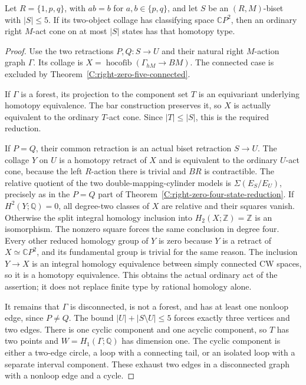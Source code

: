\begin{theorem}
\label{C:right-zero-five-state-reduction}
Let $R=\{1,p,q\}$, with $ab=b$ for $a,b\in\{p,q\}$, and let
$S$ be an $(R,M)$-biset with $|S|\leq5$.
If its two-object collage has classifying space $\mathbb CP^2$,
then an ordinary right $M$-act cone on at most $|S|$ states has
that homotopy type.
\end{theorem}
\begin{proof}
Use the two retractions $P,Q:S\to U$ and their natural right
$M$-action graph $\Gamma$. Its collage is
$X=\operatorname{hocofib}(\Gamma_{hM}\to BM)$.
The connected case is excluded by
Theorem~\ref{C:right-zero-five-connected}.

If $\Gamma$ is a forest, its projection to the component set
$T$ is an equivariant underlying homotopy equivalence. The bar
construction preserves it, so $X$ is actually equivalent to the
ordinary $T$-act cone. Since $|T|\leq|S|$, this is the required
reduction.

If $P=Q$, their common retraction is an actual biset retraction
$S\to U$. The collage $Y$ on $U$ is a homotopy retract of $X$
and is equivalent to the ordinary $U$-act cone, because the left
$R$-action there is trivial and $BR$ is contractible.
The relative quotient of the two double-mapping-cylinder models
is $\Sigma(E_S/E_U)$, precisely as in the $P=Q$ part of
Theorem~\ref{C:right-zero-four-state-reduction}.
If $H^2(Y;\mathbb Q)=0$, all degree-two classes of $X$ are relative
and their squares vanish. Otherwise the split integral homology
inclusion into $H_2(X;\mathbb Z)=\mathbb Z$ is an isomorphism.
The nonzero square forces the same conclusion in degree four.
Every other reduced homology group of $Y$ is zero because $Y$
is a retract of $X\simeq\mathbb CP^2$, and its fundamental group
is trivial for the same reason. The inclusion $Y\to X$ is an
integral homology equivalence between simply connected CW spaces,
so it is a homotopy equivalence. This obtains the actual ordinary
act of the assertion; it does not replace finite type by rational
homology alone.

It remains that $\Gamma$ is disconnected, is not a forest, and
has at least one nonloop edge, since $P\ne Q$.
The bound $|U|+|S\setminus U|\leq5$ forces exactly three
vertices and two edges. There is one cyclic component and one
acyclic component, so $T$ has two points and $W=H_1(\Gamma;\mathbb Q)$
has dimension one. The cyclic component is either a two-edge circle,
a loop with a connecting tail, or an isolated loop with a separate
interval component. These exhaust two edges in a disconnected graph
with a nonloop edge and a cycle.


\end{proof}
